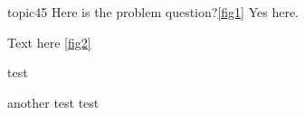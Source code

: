 \begin{problem}[requires=some label]{topic}{45}
Here is the problem question?\ref{fig1}
\label{   label 1   }
Yes here.

\begin{answers}
\answer[correct] Text here \ref{fig2}

    test

\answer[correct] another test
             test
\end {answers}
 
 \end{problem}